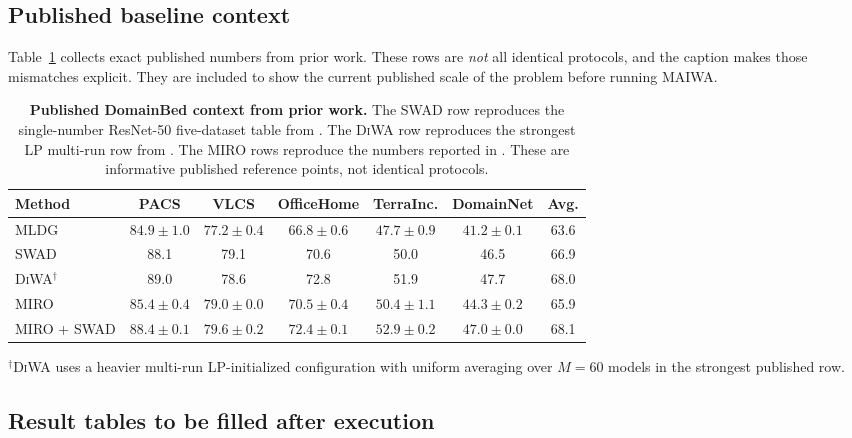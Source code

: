 \documentclass{article}
\newcommand{\maiwa}{\textup{\textsc{MAIWA}}}
\newcommand{\swad}{\textup{\textsc{SWAD}}}
\newcommand{\diwa}{\textup{\textsc{DiWA}}}
\newcommand{\miro}{\textup{\textsc{MIRO}}}
\newcommand{\mldg}{\textup{\textsc{MLDG}}}
\begin{document}
\subsection{Published baseline context}

Table~\ref{tab:published_context} collects exact published numbers from prior work. These rows are \emph{not} all identical protocols, and the caption makes those mismatches explicit. They are included to show the current published scale of the problem before running \maiwa{}.

\begin{table}[t]
    \centering
    \small
    \caption{\textbf{Published DomainBed context from prior work.} The \swad{} row reproduces the single-number ResNet-50 five-dataset table from \citet{cha2021swad}. The \diwa{} row reproduces the strongest LP multi-run row from \citet{rame2022diwa}. The \miro{} rows reproduce the numbers reported in \citet{cha2022miro}. These are informative published reference points, not identical protocols.}
    \label{tab:published_context}
    \begin{tabular}{lcccccc}
        \toprule
        Method & PACS & VLCS & OfficeHome & TerraInc. & DomainNet & Avg. \\
        \midrule
        \mldg{} \citep{li2018mldg,cha2022miro} & \(84.9\pm1.0\) & \(77.2\pm0.4\) & \(66.8\pm0.6\) & \(47.7\pm0.9\) & \(41.2\pm0.1\) & 63.6 \\
        \swad{} \citep{cha2021swad} & 88.1 & 79.1 & 70.6 & 50.0 & 46.5 & 66.9 \\
        \diwa{}\(^{\dagger}\) \citep{rame2022diwa} & 89.0 & 78.6 & 72.8 & 51.9 & 47.7 & 68.0 \\
        \miro{} \citep{cha2022miro} & \(85.4\pm0.4\) & \(79.0\pm0.0\) & \(70.5\pm0.4\) & \(50.4\pm1.1\) & \(44.3\pm0.2\) & 65.9 \\
        \miro{} + \swad{} \citep{cha2022miro} & \(88.4\pm0.1\) & \(79.6\pm0.2\) & \(72.4\pm0.1\) & \(52.9\pm0.2\) & \(47.0\pm0.0\) & 68.1 \\
        \bottomrule
    \end{tabular}

    \vspace{0.4em}
    \footnotesize
    \(^{\dagger}\)\diwa{} uses a heavier multi-run LP-initialized configuration with uniform averaging over \(M=60\) models in the strongest published row.
\end{table}

\subsection{Result tables to be filled after execution}
\end{document}
